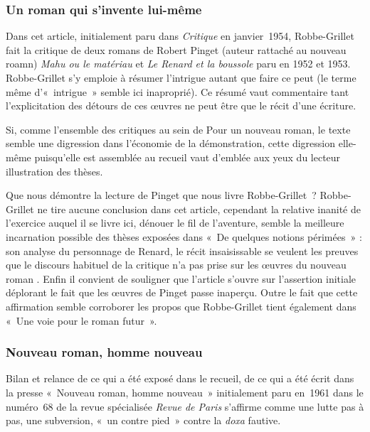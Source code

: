 \documentclass[12pt, a4paper]{article}
\begin{document}
\subsubsection{Un roman qui s'invente lui-même}
Dans cet article, initialement paru dans \textit{Critique} en janvier~1954, Robbe-Grillet fait la critique de deux romans de Robert Pinget (auteur rattaché au nouveau roamn) \textit{Mahu ou le matériau} et \textit{Le Renard et la boussole} paru en 1952 et 1953. Robbe-Grillet s'y emploie à résumer l'intrigue autant que faire ce peut (le terme même d'«~intrigue~» semble ici inaproprié). Ce résumé vaut commentaire tant l'explicitation des détours de ces œuvres ne peut être que le récit d'une écriture.

Si, comme l'ensemble des critiques au sein de Pour un nouveau roman, le texte semble une digression dans l'économie de la démonstration, cette digression elle-même puisqu'elle est assemblée au recueil vaut d'emblée aux yeux du lecteur illustration des thèses.

Que nous démontre la lecture de Pinget que nous livre Robbe-Grillet~? Robbe-Grillet ne tire aucune conclusion dans cet article, cependant la relative inanité de l'exercice auquel il se livre ici, dénouer le fil de l'aventure, semble la meilleure incarnation possible des thèses exposées dans «~De quelques notions périmées~» : son analyse du personnage de Renard, le récit insaisissable se veulent les preuves que le discours habituel de la critique n'a pas prise sur les œuvres du nouveau roman%
. Enfin il convient de souligner que l'article s'ouvre sur l'assertion initiale déplorant le fait que les œuvres de Pinget passe inaperçu. Outre le fait que cette affirmation semble corroborer les propos que Robbe-Grillet tient également dans «~Une voie pour le roman futur~».%
    
    



\subsubsection{Nouveau roman, homme nouveau}
Bilan et relance de ce qui a été exposé dans le recueil, de ce qui a été écrit dans la presse «~Nouveau roman, homme nouveau~» initialement paru en~1961 dans le numéro~68 de la revue spécialisée \textit{Revue de Paris} s'affirme comme une lutte pas à pas, une subversion, «~un contre pied~» contre la \textit{doxa} fautive.
\end{document}

